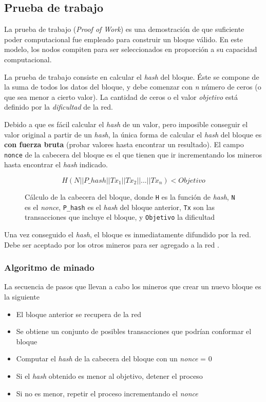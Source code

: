 \subsection{Prueba de trabajo}

La prueba de trabajo (\emph{Proof of Work}) es una demostración de que suficiente poder computacional fue empleado para construir un bloque válido. En este modelo, los nodos compiten para ser seleccionados en proporción a su capacidad computacional.

La prueba de trabajo consiste en calcular el \emph{hash} del bloque. Éste se compone de la suma de todos los datos del bloque, y debe comenzar con \emph{n} número de ceros (o que sea menor a cierto valor). La cantidad de ceros o el valor \emph{objetivo} está definido por la \emph{dificultad} de la red.     

Debido a que es fácil calcular el \emph{hash} de un valor, pero imposible conseguir el valor original a partir de un \emph{hash}, la única forma de calcular el \emph{hash} del bloque es \textbf{con fuerza bruta} (probar valores hasta encontrar un resultado). El campo \texttt{nonce} de la cabecera del bloque es el que tienen que ir incrementando los mineros hasta encontrar el \emph{hash} indicado.

\begin{figure}[H]
    \centering
    \[ H(N || P\_hash|| Tx_1 || Tx_2 || ... || Tx_n) < Objetivo \]
    \caption*{Cálculo de la cabecera del bloque, donde \texttt{H} es la función de \emph{hash}, \texttt{N} es el \emph{nonce}, \texttt{P\_hash} es el \emph{hash} del bloque anterior, \texttt{Tx} son las transacciones que incluye el bloque, y \texttt{Objetivo} la dificultad}
\end{figure}

Una vez conseguido el \emph{hash}, el bloque es inmediatamente difundido por la red. Debe ser aceptado por los otros mineros para ser agregado a la red \autocite{MasteringBlockchainProofOfWork}. 

\subsubsection*{Algoritmo de minado}

La secuencia de pasos que llevan a cabo los mineros que crear un nuevo bloque es la siguiente \autocite{MasteringBlockchainMiningAlgorithm}

\begin{itemize}
    \item El bloque anterior se recupera de la red
    \item Se obtiene un conjunto de posibles transacciones que podrían conformar el bloque
    \item Computar el \emph{hash} de la cabecera del bloque con un \emph{nonce} = 0 
    \item Si el \emph{hash} obtenido es menor al objetivo, detener el proceso
    \item Si no es menor, repetir el proceso incrementando el \emph{nonce} 
\end{itemize}

